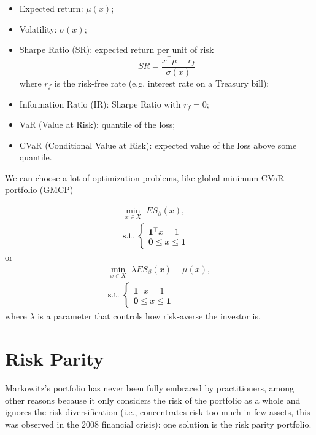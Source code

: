 \begin{itemize}
	\item Expected return: $\mu(x)$;
	\item Volatility: $\sigma(x)$;
	\item Sharpe Ratio (SR): expected return per unit of risk
	      \[
		      SR = \frac{x^\top \mu - r_f}{\sigma(x)}
	      \]
	      where $r_f$ is the risk-free rate (e.g. interest rate on a Treasury bill);
	\item Information Ratio (IR): Sharpe Ratio with $r_f=0$;
	\item VaR (Value at Risk): quantile of the loss;
	\item CVaR (Conditional Value at Risk): expected value of the loss above some quantile.
\end{itemize}

We can choose a lot of optimization problems, like global minimum CVaR portfolio (GMCP)

\begin{eqnarray}\label{prob:GMCP}
	\min_{x\in X} \,\, ES_\beta(x), \\
	\mbox{s.t. }\left\{
	\begin{aligned}\nonumber
		\mathbf{1}^\top x=1   & \\
		\mathbf{0}\leq x \leq \mathbf{1}
	\end{aligned}
	\right.
\end{eqnarray}
 or 
\begin{eqnarray}\label{prob:GMCP2}
	\min_{x\in X} \,\, \lambda ES_\beta(x) - \mu(x) , \\
	\mbox{s.t. }\left\{
	\begin{aligned}\nonumber
		\mathbf{1}^\top x=1   & \\
		\mathbf{0}\leq x \leq \mathbf{1}
	\end{aligned}
	\right.
\end{eqnarray}
where $\lambda$ is a parameter that controls how risk-averse the investor is.


\section{Risk Parity}

Markowitz’s portfolio has never been fully embraced by practitioners, among other reasons because it only considers the risk of the portfolio as a whole and ignores the risk diversification (i.e., concentrates risk too much in few assets, this was observed in the 2008 financial crisis): one solution is the risk parity portfolio.

